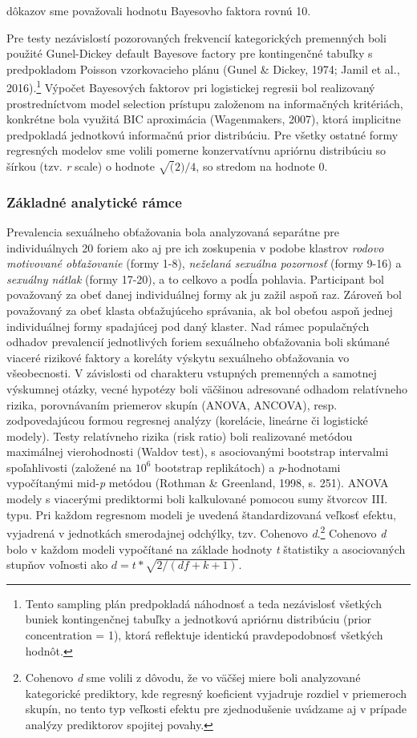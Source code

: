\documentclass[
]{article}
\begin{document}
dôkazov sme považovali hodnotu Bayesovho faktora rovnú 10.

Pre testy nezávislostí pozorovaných frekvencií kategorických premenných boli použité Gunel-Dickey default Bayesove factory pre kontingenčné tabuľky s predpokladom Poisson vzorkovacieho plánu (Gunel \& Dickey, 1974; Jamil et al., 2016).\footnote{Tento sampling plán predpokladá náhodnosť a teda nezávislosť všetkých buniek kontingenčnej tabuľky a jednotkovú apriórnu distribúciu (prior concentration = 1), ktorá reflektuje identickú pravdepodobnosť všetkých hodnôt.} Výpočet Bayesových faktorov pri logistickej regresii bol realizovaný prostredníctvom model selection prístupu založenom na informačných kritériách, konkrétne bola využitá BIC aproximácia (Wagenmakers, 2007), ktorá implicitne predpokladá jednotkovú informačnú prior distribúciu. Pre všetky ostatné formy regresných modelov sme volili pomerne konzervatívnu apriórnu distribúciu so šírkou (tzv. \emph{r} scale) o hodnote \(\sqrt(2)/4\), so stredom na hodnote 0.

\hypertarget{zuxe1kladnuxe9-analytickuxe9-ruxe1mce}{%
\subsubsection{Základné analytické rámce}\label{zuxe1kladnuxe9-analytickuxe9-ruxe1mce}}

Prevalencia sexuálneho obťažovania bola analyzovaná separátne pre individuálnych 20 foriem ako aj pre ich zoskupenia v podobe klastrov \emph{rodovo motivované obťažovanie} (formy 1-8), \emph{neželaná sexuálna pozornosť} (formy 9-16) a \emph{sexuálny nátlak} (formy 17-20), a to celkovo a podĺa pohlavia. Participant bol považovaný za obeť danej individuálnej formy ak ju zažil aspoň raz. Zároveň bol považovaný za obeť klasta obťažujúceho správania, ak bol obeťou aspoň jednej individuálnej formy spadajúcej pod daný klaster. Nad rámec populačných odhadov prevalencií jednotlivých foriem sexuálneho obťažovania boli skúmané viaceré rizikové faktory a koreláty výskytu sexuálneho obťažovania vo všeobecnosti. V závislosti od charakteru vstupných premenných a samotnej výskumnej otázky, vecné hypotézy boli väčšinou adresované odhadom relatívneho rizika, porovnávaním priemerov skupín (ANOVA, ANCOVA), resp. zodpovedajúcou formou regresnej analýzy (korelácie, lineárne či logistické modely). Testy relatívneho rizika (risk ratio) boli realizované metódou maximálnej vierohodnosti (Waldov test), s asociovanými bootstrap intervalmi spoľahlivosti (založené na \(10^6\) bootstrap replikátoch) a \emph{p}-hodnotami vypočítanými mid-\emph{p} metódou (Rothman \& Greenland, 1998, s. 251). ANOVA modely s viacerými prediktormi boli kalkulované pomocou sumy štvorcov III. typu. Pri každom regresnom modeli je uvedená štandardizovaná veľkosť efektu, vyjadrená v jednotkách smerodajnej odchýlky, tzv. Cohenovo \emph{d}.\footnote{Cohenovo \emph{d} sme volili z dôvodu, že vo väčšej miere boli analyzované kategorické prediktory, kde regresný koeficient vyjadruje rozdiel v priemeroch skupín, no tento typ veľkosti efektu pre zjednodušenie uvádzame aj v prípade analýzy prediktorov spojitej povahy.} Cohenovo \emph{d} bolo v každom modeli vypočítané na základe hodnoty \emph{t} štatistiky a asociovaných stupňov voľnosti ako \(d = t*\sqrt{2/(df+k+1)}\).
\end{document}

